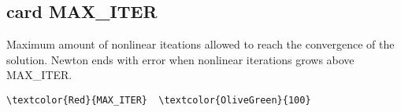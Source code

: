 \subsection{card MAX_ITER}
Maximum amount of nonlinear iteations allowed to reach the convergence of the solution. Newton ends with error when nonlinear iterations grows above MAX_ITER.
\begin{Verbatim}[frame=single,commandchars=\\\{\}]
\textcolor{Red}{MAX_ITER}  \textcolor{OliveGreen}{100}
\end{Verbatim}





